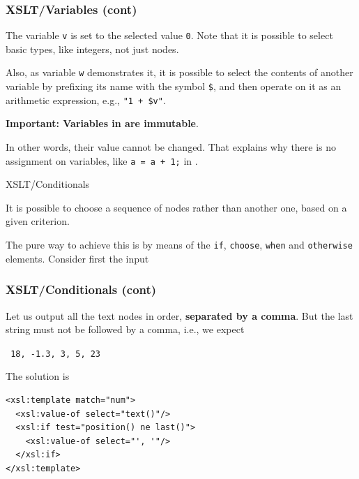 %
\begin{frame}[containsverbatim]
\frametitle{XSLT/Variables (cont)}

The variable \texttt{v} is set to the selected value \texttt{0}. Note
that it is possible to select basic types, like integers, not just
nodes.

\bigskip

Also, as variable \texttt{w} demonstrates it, it is possible to select
the contents of another variable by prefixing its name with the symbol
\texttt{\$}, and then operate on it as an arithmetic expression, e.g.,
\verb|"1 + $v"|.

\bigskip

\textbf{Important: Variables in \XSLT are immutable}.

\bigskip

In other words, their value cannot be changed. That explains why there
is no assignment on variables, like \verb|a = a + 1;| in \Clang.

\end{frame}

%
\begin{frame}{XSLT/Conditionals}

It is possible to choose a sequence of nodes rather than another one,
based on a given criterion.

\bigskip

The pure \XSLT way to achieve this is by means of the \texttt{if},
\texttt{choose}, \texttt{when} and \texttt{otherwise}
elements. Consider first the input

\end{frame}

%
\begin{frame}[containsverbatim]
\frametitle{XSLT/Conditionals (cont)}

Let us output all the text nodes in order, \textbf{separated by a
  comma}. But the last string must not be followed by a comma, i.e.,
we expect
\begin{center}\tt
18, -1.3, 3, 5, 23
\end{center}
The solution is
{\small
\begin{verbatim}
<xsl:template match="num">
  <xsl:value-of select="text()"/>
  <xsl:if test="position() ne last()">
    <xsl:value-of select="', '"/>
  </xsl:if>
</xsl:template>
\end{verbatim}
}

\end{frame}

